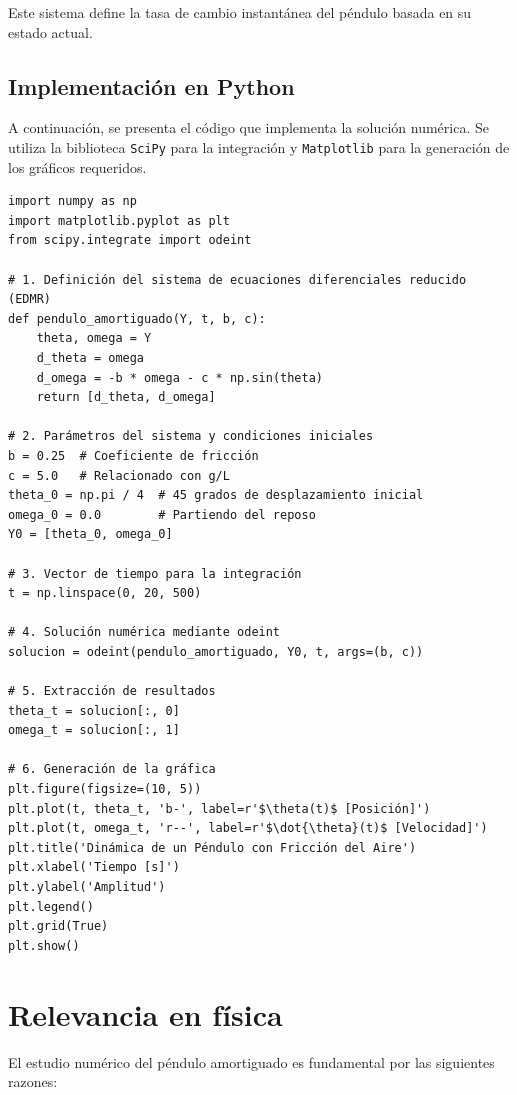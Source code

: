 \documentclass[a4paper]{article}
\begin{document}
Este sistema define la tasa de cambio instantánea del péndulo basada en su estado actual.

\subsection{Implementación en Python}

A continuación, se presenta el código que implementa la solución numérica. Se utiliza la biblioteca \texttt{SciPy} para la integración y \texttt{Matplotlib} para la generación de los gráficos requeridos.

\begin{verbatim}
import numpy as np
import matplotlib.pyplot as plt
from scipy.integrate import odeint

# 1. Definición del sistema de ecuaciones diferenciales reducido (EDMR)
def pendulo_amortiguado(Y, t, b, c):
    theta, omega = Y
    d_theta = omega
    d_omega = -b * omega - c * np.sin(theta)
    return [d_theta, d_omega]

# 2. Parámetros del sistema y condiciones iniciales
b = 0.25  # Coeficiente de fricción
c = 5.0   # Relacionado con g/L
theta_0 = np.pi / 4  # 45 grados de desplazamiento inicial
omega_0 = 0.0        # Partiendo del reposo
Y0 = [theta_0, omega_0]

# 3. Vector de tiempo para la integración
t = np.linspace(0, 20, 500)

# 4. Solución numérica mediante odeint
solucion = odeint(pendulo_amortiguado, Y0, t, args=(b, c))

# 5. Extracción de resultados
theta_t = solucion[:, 0]
omega_t = solucion[:, 1]

# 6. Generación de la gráfica
plt.figure(figsize=(10, 5))
plt.plot(t, theta_t, 'b-', label=r'$\theta(t)$ [Posición]')
plt.plot(t, omega_t, 'r--', label=r'$\dot{\theta}(t)$ [Velocidad]')
plt.title('Dinámica de un Péndulo con Fricción del Aire')
plt.xlabel('Tiempo [s]')
plt.ylabel('Amplitud')
plt.legend()
plt.grid(True)
plt.show()
\end{verbatim}

\section*{Relevancia en física}

El estudio numérico del péndulo amortiguado es fundamental por las siguientes razones:
\end{document}
